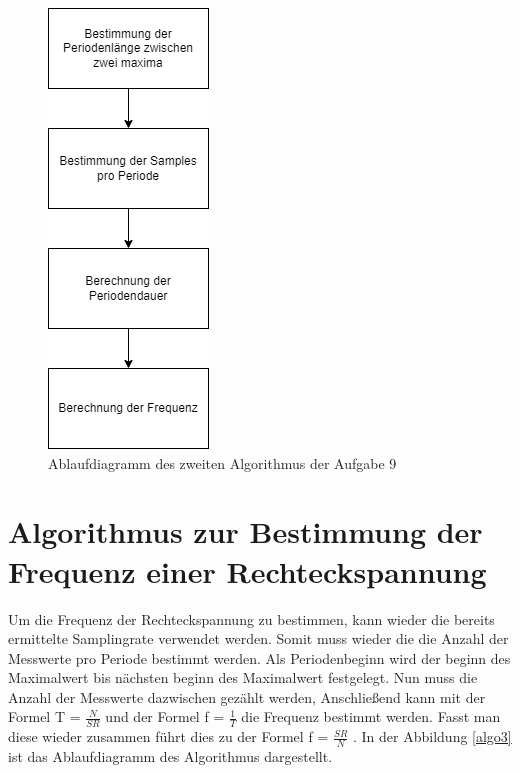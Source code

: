 \begin{figure}[h]
	\centering
	\includegraphics[scale=0.5]{Images/aufgabe9_algo2.png}
	\caption{Ablaufdiagramm des zweiten Algorithmus der Aufgabe 9}
	\label{algo2}
\end{figure}

\section{Algorithmus zur Bestimmung der Frequenz einer Rechteckspannung}
Um die Frequenz der Rechteckspannung zu bestimmen, kann wieder die bereits ermittelte Samplingrate verwendet werden. 
Somit muss wieder die die Anzahl der Messwerte pro Periode bestimmt werden.
Als Periodenbeginn wird der beginn des Maximalwert bis nächsten beginn des Maximalwert festgelegt.
Nun muss die Anzahl der Messwerte dazwischen gezählt werden,
Anschließend kann mit der Formel T = $\frac{N}{SR}$ und der Formel f = $\frac{1}{T}$ die Frequenz bestimmt werden.
Fasst man diese wieder zusammen führt dies zu der Formel f = $\frac{SR}{N}$ .
In der Abbildung \ref{algo3} ist das Ablaufdiagramm des Algorithmus dargestellt.\par

